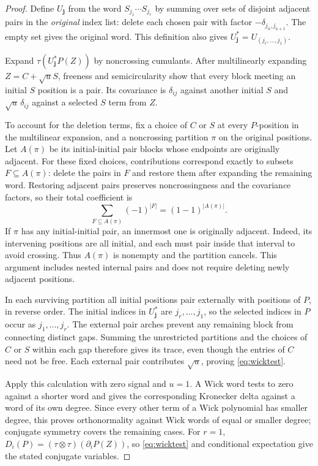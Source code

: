 \begin{proof}
Define $U_{\mathbf j}$ from the word $S_{j_1}\cdots S_{j_r}$ by summing
over sets of disjoint adjacent pairs in the \emph{original} index list:
delete each chosen pair with factor $-\delta_{j_a,j_{a+1}}$.
The empty set gives the original word. This definition also gives
$U_{\mathbf j}^*=U_{(j_r,\ldots,j_1)}$.

Expand $\tau(U_{\mathbf j}^*P(Z))$ by noncrossing cumulants. After
multilinearly expanding $Z=C+\sqrt u S$, freeness and semicircularity
show that every block meeting an initial $S$ position is a pair.
Its covariance is $\delta_{ij}$ against another initial $S$ and
$\sqrt u\,\delta_{ij}$ against a selected $S$ term from $Z$.

To account for the deletion terms, fix a choice of $C$ or $S$ at every
$P$-position in the multilinear expansion, and a noncrossing partition
$\pi$ on the original positions. Let $A(\pi)$ be its initial-initial pair
blocks whose endpoints are originally adjacent. For these fixed choices,
contributions correspond exactly to subsets $F\subseteq A(\pi)$: delete the pairs
in $F$ and restore them after expanding the remaining word. Restoring
adjacent pairs preserves noncrossingness and the covariance factors,
so their total coefficient is
\[
 \sum_{F\subseteq A(\pi)}(-1)^{|F|}=(1-1)^{|A(\pi)|}.
\]
If $\pi$ has any initial-initial pair, an innermost one is originally
adjacent. Indeed, its intervening positions are all initial, and each
must pair inside that interval to avoid crossing. Thus $A(\pi)$ is
nonempty and the partition cancels. This argument includes nested
internal pairs and does not require deleting newly adjacent positions.

In each surviving partition all initial positions pair externally with
positions of $P$, in reverse order. The initial indices in
$U_{\mathbf j}^*$ are $j_r,\ldots,j_1$, so the selected indices in $P$
occur as $j_1,\ldots,j_r$. The external pair arches prevent any remaining
block from connecting distinct gaps. Summing the unrestricted partitions
and the choices of $C$ or $S$ within each gap therefore gives its trace,
even though the entries of $C$ need not be free. Each external pair contributes $\sqrt u$, proving
\eqref{eq:wicktest}.

Apply this calculation with zero signal and $u=1$. A Wick word tests
to zero against a shorter word and gives the corresponding Kronecker
delta against a word of its own degree. Since every other term of a
Wick polynomial has smaller degree, this proves orthonormality against
Wick words of equal or smaller degree; conjugate symmetry covers the
remaining cases. For $r=1$, $D_i(P)=(\tau\otimes\tau)(\partial_iP(Z))$,
so \eqref{eq:wicktest} and conditional expectation give the stated
conjugate variables.
\end{proof}

